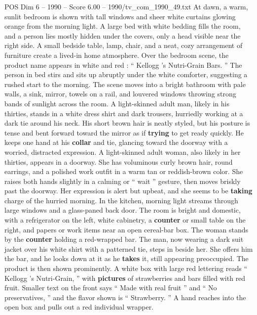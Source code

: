 \begin{textsample}{POS Dim 6 – 1990 – Score 6.00 – 1990/tv\_com\_1990\_49.txt}  \label{ex:f6_pos_076}
At dawn, a warm, sunlit bedroom is shown with tall windows and sheer white curtains glowing orange from the morning light.
A large bed with white bedding fills the room, and a person lies mostly hidden under the covers, only a head visible near the right side.
A small bedside table, lamp, chair, and a neat, cozy arrangement of furniture create a lived-in home atmosphere.
Over the bedroom scene, the product name appears in white and red : “ Kellogg ’s Nutri-Grain Bars. ” The person in bed stirs and sits up abruptly under the white comforter, suggesting a rushed start to the morning.
The scene moves into a bright bathroom with pale walls, a sink, mirror, towels on a rail, and louvered windows throwing strong bands of sunlight across the room.
A light-skinned adult man, likely in his thirties, stands in a white dress shirt and dark trousers, hurriedly working at a dark tie around his neck.
His short brown hair is neatly styled, but his posture is tense and bent forward toward the mirror as if \textbf{trying} to get ready quickly.
He keeps one hand at his \textbf{collar} and tie, glancing toward the doorway with a worried, distracted expression.
A light-skinned adult woman, also likely in her thirties, appears in a doorway.
She has voluminous curly brown hair, round earrings, and a polished work outfit in a warm tan or reddish-brown color.
She raises both hands slightly in a calming or “ wait ” gesture, then moves briskly past the doorway.
Her expression is alert but upbeat, and she seems to be \textbf{taking} charge of the hurried morning.
In the kitchen, morning light streams through large windows and a glass-paned back door.
The room is bright and domestic, with a refrigerator on the left, white cabinetry, a \textbf{counter} or small table on the right, and papers or work items near an open cereal-bar box.
The woman stands by the \textbf{counter} holding a red-wrapped bar.
The man, now wearing a dark suit jacket over his white shirt with a patterned tie, steps in beside her.
She offers him the bar, and he looks down at it as he \textbf{takes} it, still appearing preoccupied.
The product is then shown prominently.
A white box with large red lettering reads “ Kellogg ’s Nutri-Grain, ” with \textbf{pictures} of strawberries and bars filled with red fruit.
Smaller text on the front says “ Made with real fruit ” and “ No preservatives, ” and the flavor shown is “ Strawberry. ” A hand reaches into the open box and pulls out a red individual wrapper.

\end{textsample}

